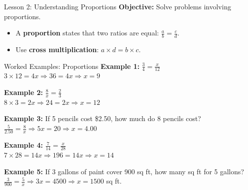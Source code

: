 \documentclass{beamer}
\begin{document}
\begin{frame}{Lesson 2: Understanding Proportions}
\textbf{Objective:} Solve problems involving proportions.
\begin{itemize}
    \item A \textbf{proportion} states that two ratios are equal: $\frac{a}{b} = \frac{c}{d}$.
    \item Use \textbf{cross multiplication}: $a \times d = b \times c$.
\end{itemize}
\vspace{1em}
\begin{center}
\end{center}
\end{frame}

\begin{frame}{Worked Examples: Proportions}
\textbf{Example 1:} $\frac{3}{4} = \frac{x}{12}$\\
$3 \times 12 = 4x \Rightarrow 36 = 4x \Rightarrow x = 9$

\vspace{0.5em}
\textbf{Example 2:} $\frac{8}{x} = \frac{2}{3}$\\
$8 \times 3 = 2x \Rightarrow 24 = 2x \Rightarrow x = 12$

\vspace{0.5em}
\textbf{Example 3:} If 5 pencils cost \$2.50, how much do 8 pencils cost?\\
$\frac{5}{2.50} = \frac{8}{x} \Rightarrow 5x = 20 \Rightarrow x = 4.00$

\vspace{0.5em}
\textbf{Example 4:} $\frac{7}{14} = \frac{x}{28}$\\
$7 \times 28 = 14x \Rightarrow 196 = 14x \Rightarrow x = 14$

\vspace{0.5em}
\textbf{Example 5:} If 3 gallons of paint cover 900 sq ft, how many sq ft for 5 gallons?\\
$\frac{3}{900} = \frac{5}{x} \Rightarrow 3x = 4500 \Rightarrow x = 1500$ sq ft.
\end{frame}
\end{document}
